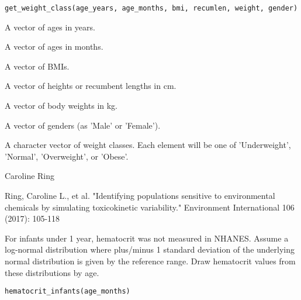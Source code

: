 \documentclass[a4paper]{book}
\begin{document}
%
\begin{Usage}
\begin{verbatim}
get_weight_class(age_years, age_months, bmi, recumlen, weight, gender)
\end{verbatim}
\end{Usage}
%
\begin{Arguments}
\begin{ldescription}
\item[\code{age\_years}] A vector of
ages in years.

\item[\code{age\_months}] A vector of ages in months.

\item[\code{bmi}] A vector of BMIs.

\item[\code{recumlen}] A vector of heights or recumbent lengths in cm.

\item[\code{weight}] A vector of body weights in kg.

\item[\code{gender}] A vector of genders (as 'Male' or 'Female').
\end{ldescription}
\end{Arguments}
%
\begin{Value}
A character vector of weight classes. Each element will be one of
'Underweight', 'Normal', 'Overweight', or 'Obese'.
\end{Value}
%
\begin{Author}\relax
Caroline Ring
\end{Author}
%
\begin{References}\relax
Ring, Caroline L., et al. "Identifying populations sensitive to 
environmental chemicals by simulating toxicokinetic variability." Environment 
International 106 (2017): 105-118
\end{References}
%
\begin{Description}\relax
For infants under 1 year, hematocrit was not measured in NHANES. Assume a
log-normal distribution where plus/minus 1 standard deviation of the
underlying normal distribution is given by the reference range. Draw
hematocrit values from these distributions by age.
\end{Description}
%
\begin{Usage}
\begin{verbatim}
hematocrit_infants(age_months)
\end{verbatim}
\end{Usage}
\end{document}
